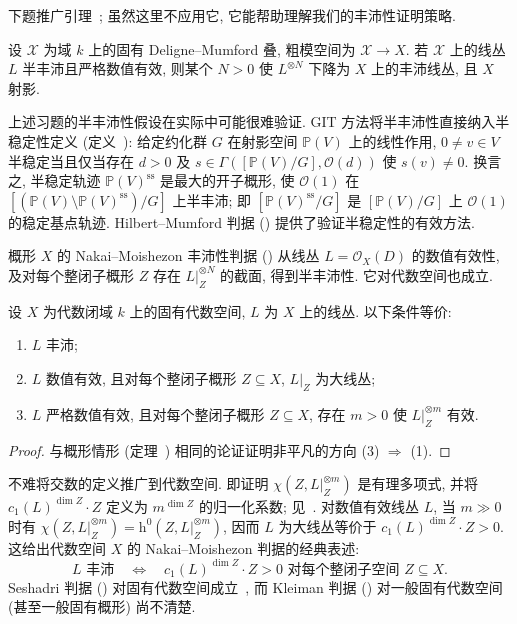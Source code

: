 下题推广引理~; 虽然这里不应用它, 它能帮助理解我们的丰沛性证明策略.
\begin{exercise}[容易]\label{src:6.9.9}
设 $\mathcal X$ 为域 $k$ 上的固有 Deligne--Mumford 叠, 粗模空间为 $\mathcal X\to\allowbreak X$. 若 $\mathcal X$ 上的线丛 $L$ 半丰沛且严格数值有效, 则某个 $N>0$ 使 $L^{\otimes N}$ 下降为 $X$ 上的丰沛线丛, 且 $X$ 射影.
\end{exercise}
上述习题的半丰沛性假设在实际中可能很难验证. GIT 方法将半丰沛性直接纳入半稳定性定义 (定义~): 给定约化群 $G$ 在射影空间 $\mathbb P(V)$ 上的线性作用, $0\ne v\in V$ 半稳定当且仅当存在 $d>0$ 及 $s\in\Gamma([\mathbb P(V)/G],\allowbreak \mathcal O(d))$ 使 $s(v)\ne0$. 换言之, 半稳定轨迹 $\mathbb P(V)^{\mathrm{ss}}$ 是最大的开子概形, 使 $\mathcal O(1)$ 在 $[(\mathbb P(V)\setminus\mathbb P(V)^{\mathrm{ss}})/G]$ 上半丰沛; 即 $[\mathbb P(V)^{\mathrm{ss}}/G]$ 是 $[\mathbb P(V)/G]$ 上 $\mathcal O(1)$ 的稳定基点轨迹. Hilbert--Mumford 判据 () 提供了验证半稳定性的有效方法.

概形 $X$ 的 Nakai--Moishezon 丰沛性判据 () 从线丛 $L=\mathcal O_X(D)$ 的数值有效性, 及对每个整闭子概形 $Z$ 存在 $L|_Z^{\otimes N}$ 的截面, 得到半丰沛性. 它对代数空间也成立.
\begin{theorem}\label{src:6.9.10}
设 $X$ 为代数闭域 $k$ 上的固有代数空间, $L$ 为 $X$ 上的线丛. 以下条件等价:
\begin{enumerate}[(1)]
\item $L$ 丰沛;
\item $L$ 数值有效, 且对每个整闭子概形 $Z\subseteq X$, $L|_Z$ 为大线丛;
\item $L$ 严格数值有效, 且对每个整闭子概形 $Z\subseteq X$, 存在 $m>0$ 使 $L|_Z^{\otimes m}$ 有效.
\end{enumerate}
\end{theorem}
\begin{proof}
与概形情形 (定理~) 相同的论证证明非平凡的方向 (3) $\Rightarrow$ (1).
\end{proof}
\begin{remark}[经典表述]\label{src:6.9.11}
不难将交数的定义推广到代数空间. 即证明 $\chi(Z,\allowbreak L|_Z^{\otimes m})$ 是有理多项式, 并将 $c_1(L)^{\dim Z}\cdot Z$ 定义为 $m^{\dim Z}$ 的归一化系数; 见~\cite[标签 0DN3]{SP}. 对数值有效线丛 $L$, 当 $m\gg0$ 时有 $\chi(Z,\allowbreak L|_Z^{\otimes m})=\mathrm h^0(Z,\allowbreak L|_Z^{\otimes m})$, 因而 $L$ 为大线丛等价于 $c_1(L)^{\dim Z}\cdot Z>0$. 这给出代数空间 $X$ 的 Nakai--Moishezon 判据的经典表述:
\[
L\text{ 丰沛}\quad\Longleftrightarrow\quad c_1(L)^{\dim Z}\cdot Z>0\text{ 对每个整闭子空间 }Z\subseteq X.
\]
Seshadri 判据 () 对固有代数空间成立~\cite{Cor93}, 而 Kleiman 判据 () 对一般固有代数空间 (甚至一般固有概形) 尚不清楚.
\end{remark}
